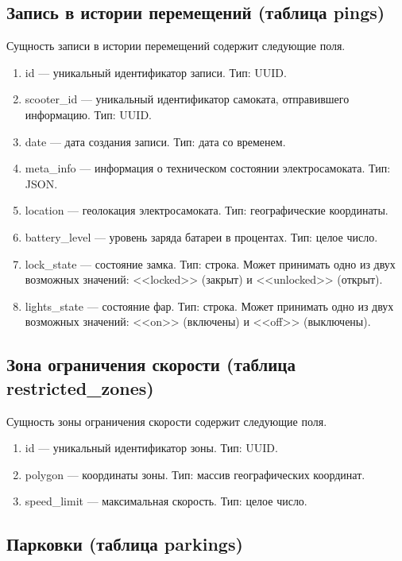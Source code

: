 \subsection{Запись в истории перемещений (таблица pings)}

Сущность записи в истории перемещений содержит следующие поля.

\begin{enumerate}
    \item id --- уникальный идентификатор записи. Тип: UUID. 
    \item scooter\_id --- уникальный идентификатор самоката, отправившего информацию. Тип: UUID. 
    \item date --- дата создания записи. Тип: дата со временем. 
    \item meta\_info --- информация о техническом состоянии электросамоката. Тип: JSON. 
    \item location --- геолокация электросамоката. Тип: географические координаты. 
    \item battery\_level --- уровень заряда батареи в процентах. Тип: целое число. 
    \item lock\_state --- состояние замка. Тип: строка. Может принимать одно из двух возможных значений: <<locked>> (закрыт) и <<unlocked>> (открыт). 
    \item lights\_state --- состояние фар. Тип: строка. Может принимать одно из двух возможных значений: <<on>> (включены) и <<off>> (выключены). 
\end{enumerate}

\subsection{Зона ограничения скорости (таблица restricted\_zones)}

Сущность зоны ограничения скорости содержит следующие поля.

\begin{enumerate}
    \item id --- уникальный идентификатор зоны. Тип: UUID. 
    \item polygon --- координаты зоны. Тип: массив географических координат.
    \item speed\_limit --- максимальная скорость. Тип: целое число.
\end{enumerate}

\subsection{Парковки (таблица parkings)}

